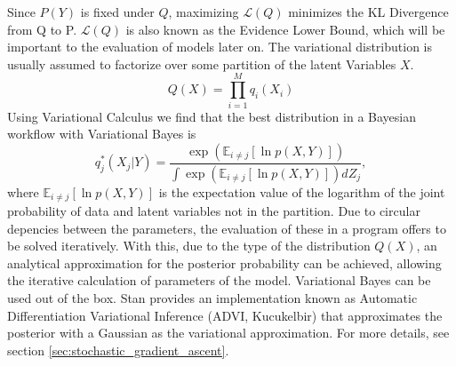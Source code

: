 Since $P(Y)$ is fixed under $Q$, maximizing $\mathcal{L}(Q)$ minimizes the KL Divergence from Q to P. $\mathcal{L}(Q)$ is also known as the Evidence Lower Bound, which will be important to the evaluation of models later on. The variational distribution is usually assumed to factorize over some partition of the latent Variables $X$. 
\begin{equation}%
	Q(X) = \prod_{i=1}^{M} q_i(X_i)
	\label{eq: Variational Distribution Factorisation}
\end{equation}
Using Variational Calculus we find that the best distribution in a Bayesian workflow with Variational Bayes is
\begin{equation}%
	q_j^* (X_j|Y) = \frac{\exp(\mathbb{E}_{i\neq j}[\ln p(X,Y)])}{\int \exp(\mathbb{E}_{i\neq j}[\ln p(X,Y)]) dZ_j},
	\label{eq: VB best Distribution}
\end{equation}
where $\mathbb{E}_{i\neq j}[\ln p(X,Y)]$ is the expectation value of the logarithm of the joint probability of data and latent variables not in the partition. Due to circular depencies between the parameters, the evaluation of these in a program offers to be solved iteratively. With this, due to the type of the distribution $Q(X)$, an analytical approximation for the posterior probability can be achieved, allowing the iterative calculation of parameters of the model. Variational Bayes can be used out of the box. Stan provides an implementation known as Automatic Differentiation Variational Inference (ADVI, Kucukelbir) that approximates the posterior with a Gaussian as the variational approximation. For more details, see section \ref{sec:stochastic_gradient_ascent}.